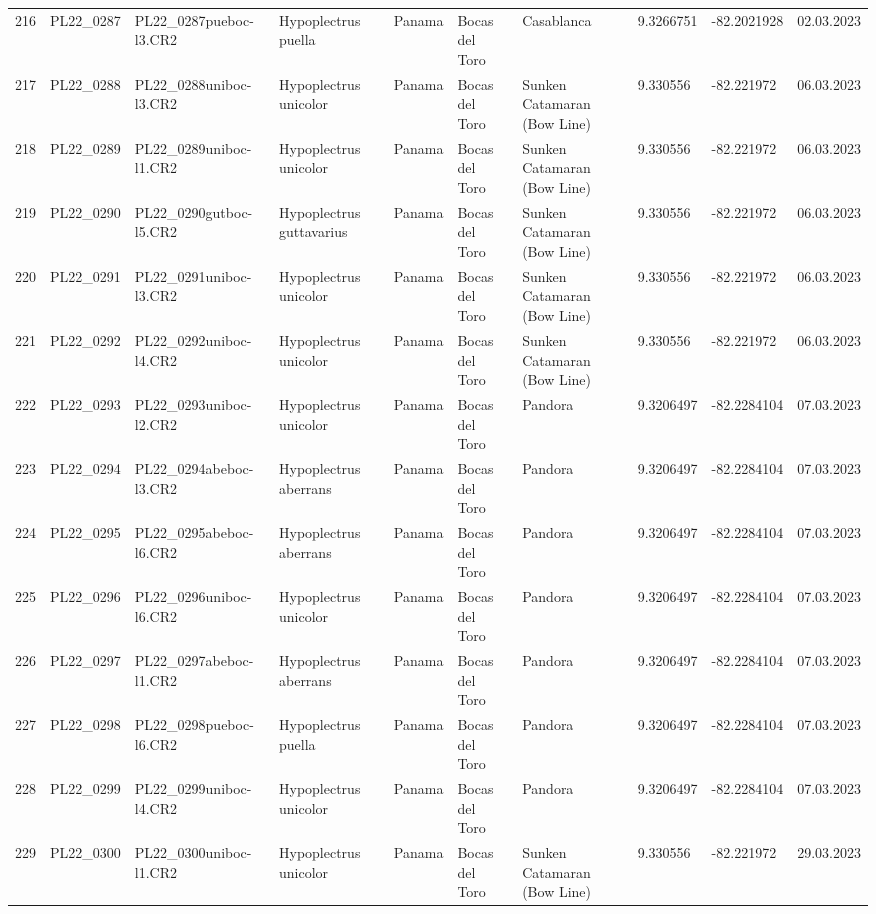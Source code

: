 \begin{table}[ht]
\begin{tabular}{rlllllllll}
  216 & PL22\_0287 & PL22\_0287pueboc-l3.CR2 & Hypoplectrus puella & Panama & Bocas del Toro & Casablanca & 9.3266751 & -82.2021928 & 02.03.2023 \\ 
  217 & PL22\_0288 & PL22\_0288uniboc-l3.CR2 & Hypoplectrus unicolor & Panama & Bocas del Toro & Sunken Catamaran (Bow Line) & 9.330556 & -82.221972 & 06.03.2023 \\ 
  218 & PL22\_0289 & PL22\_0289uniboc-l1.CR2 & Hypoplectrus unicolor & Panama & Bocas del Toro & Sunken Catamaran (Bow Line) & 9.330556 & -82.221972 & 06.03.2023 \\ 
  219 & PL22\_0290 & PL22\_0290gutboc-l5.CR2 & Hypoplectrus guttavarius & Panama & Bocas del Toro & Sunken Catamaran (Bow Line) & 9.330556 & -82.221972 & 06.03.2023 \\ 
  220 & PL22\_0291 & PL22\_0291uniboc-l3.CR2 & Hypoplectrus unicolor & Panama & Bocas del Toro & Sunken Catamaran (Bow Line) & 9.330556 & -82.221972 & 06.03.2023 \\ 
  221 & PL22\_0292 & PL22\_0292uniboc-l4.CR2 & Hypoplectrus unicolor & Panama & Bocas del Toro & Sunken Catamaran (Bow Line) & 9.330556 & -82.221972 & 06.03.2023 \\ 
  222 & PL22\_0293 & PL22\_0293uniboc-l2.CR2 & Hypoplectrus unicolor & Panama & Bocas del Toro & Pandora & 9.3206497 & -82.2284104 & 07.03.2023 \\ 
  223 & PL22\_0294 & PL22\_0294abeboc-l3.CR2 & Hypoplectrus aberrans & Panama & Bocas del Toro & Pandora & 9.3206497 & -82.2284104 & 07.03.2023 \\ 
  224 & PL22\_0295 & PL22\_0295abeboc-l6.CR2 & Hypoplectrus aberrans & Panama & Bocas del Toro & Pandora & 9.3206497 & -82.2284104 & 07.03.2023 \\ 
  225 & PL22\_0296 & PL22\_0296uniboc-l6.CR2 & Hypoplectrus unicolor & Panama & Bocas del Toro & Pandora & 9.3206497 & -82.2284104 & 07.03.2023 \\ 
  226 & PL22\_0297 & PL22\_0297abeboc-l1.CR2 & Hypoplectrus aberrans & Panama & Bocas del Toro & Pandora & 9.3206497 & -82.2284104 & 07.03.2023 \\ 
  227 & PL22\_0298 & PL22\_0298pueboc-l6.CR2 & Hypoplectrus puella & Panama & Bocas del Toro & Pandora & 9.3206497 & -82.2284104 & 07.03.2023 \\ 
  228 & PL22\_0299 & PL22\_0299uniboc-l4.CR2 & Hypoplectrus unicolor & Panama & Bocas del Toro & Pandora & 9.3206497 & -82.2284104 & 07.03.2023 \\ 
  229 & PL22\_0300 & PL22\_0300uniboc-l1.CR2 & Hypoplectrus unicolor & Panama & Bocas del Toro & Sunken Catamaran (Bow Line) & 9.330556 & -82.221972 & 29.03.2023 \\ 

\end{tabular}
\end{table}
